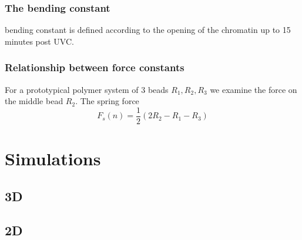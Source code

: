 \documentclass[12pt]{report}
\begin{document}
     \subsubsection{The bending constant}
       bending constant is defined according to the opening of the chromatin up to 15 minutes post UVC. 
     \subsubsection{Relationship between force constants}
      For a prototypical polymer system of 3 beads $R_1,R_2,R_3$ we examine the force on the middle bead $R_2$.
      The spring force
      \begin{equation*}
      F_s(n) = \frac{1}{2}(2R_2-R_1-R_3)
      \end{equation*}
     



             		
	\section{Simulations}
	
	\subsection{ 3D}
	\subsection{2D}
	
	
	
\end{document}
